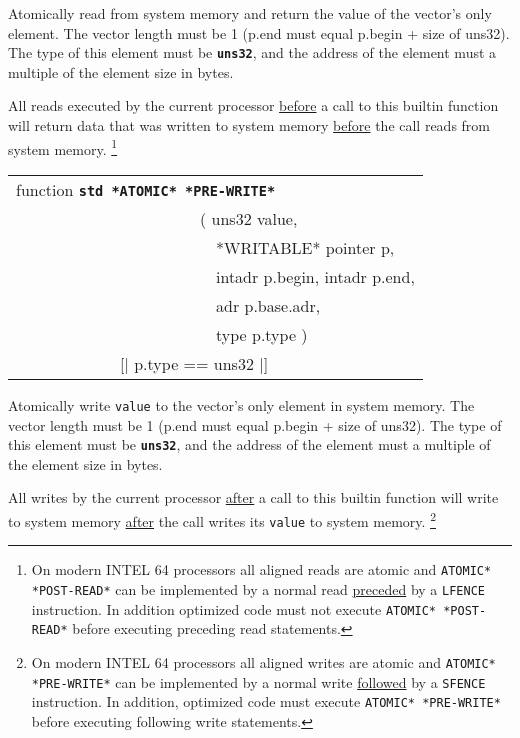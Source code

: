 \documentclass[12pt]{article}
\makeatletter
\newcommand{\TT}[1]{{\tt \bfseries #1}}
\newcommand{\ttstdkey}[1]{\TT{std #1}\index{#1@{\tt std #1}}}
\newenvironment{indpar}[1][0.3in]%
	{\begin{list}{}%
		     {\setlength{\itemsep}{0in}%
		      \setlength{\topsep}{0in}%
		      \setlength{\parsep}{1ex}%
		      \setlength{\labelwidth}{#1}%
		      \setlength{\leftmargin}{#1}%
		      \addtolength{\leftmargin}{\labelsep}}%
	 \item}%
	{\end{list}}
\makeatother
\begin{document}
\begin{indpar}
\begin{indpar}
Atomically read from system memory
and return the value of the vector's only element.
The vector length must be 1 (p.end must equal p.begin + size of uns32).
The type of this element must be \TT{uns32}, and the address of the element
must a multiple of the element size in bytes.

All reads executed by the current processor \underline{before}
a call to this builtin function will return data that was written
to system memory \underline{before} the call reads from system memory.%
\footnote{On modern INTEL 64 processors
all aligned reads are atomic and {\tt *ATOMIC* *POST-READ*} can be implemented
by a normal read \underline{preceded} by a {\tt LFENCE} instruction.  In
addition optimized code must not execute {\tt *ATOMIC* *POST-READ*}
before executing preceding read statements.}
\end{indpar}

{\tt\begin{tabular}{@{}l}
function \ttstdkey{*ATOMIC* *PRE-WRITE*} \\
~~~~~~~~~~~~~~~~~~~~~~~( uns32 value, \\
~~~~~~~~~~~~~~~~~~~~~~~~~*WRITABLE* pointer p, \\
~~~~~~~~~~~~~~~~~~~~~~~~~intadr p.begin, intadr p.end, \\
~~~~~~~~~~~~~~~~~~~~~~~~~adr p.base.adr, \\
~~~~~~~~~~~~~~~~~~~~~~~~~type p.type ) \\
~~~~~~~~~~~~~[| p.type == uns32 |] \\
\end{tabular}}

\begin{indpar}
Atomically write {\tt value} to the vector's only element in system memory.
The vector length must be 1 (p.end must equal p.begin + size of uns32).
The type of this element must be \TT{uns32}, and the address of the element
must a multiple of the element size in bytes.

All writes by the current processor \underline{after} a call to
this builtin function will write
to system memory \underline{after} the call writes its {\tt value}
to system memory.%
\footnote{On modern INTEL 64 processors
all aligned writes are atomic and {\tt *ATOMIC* *PRE-WRITE*} can be implemented
by a normal write \underline{followed} by a {\tt SFENCE} instruction.
In addition, optimized code must execute
{\tt *ATOMIC* *PRE-WRITE*} before executing following write statements. }
\end{indpar}


\end{indpar}
\end{document}
